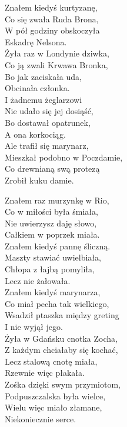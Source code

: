 \begin{multicols}{2}
Znałem kiedyś kurtyzanę, \\
Co się zwała Ruda Brona, \\
W pół godziny obskoczyła\\
Eskadrę Nelsona.\\

Żyła raz w Londynie dziwka, \\
Co ją zwali Krwawa Bronka, \\
Bo jak zaciskała uda, \\
Obcinała członka.\\

I żadnemu żeglarzowi\\
Nie udało się jej dosiąść, \\
Bo dostawał opatrunek, \\
A ona korkociąg.\\

Ale trafił się marynarz, \\
Mieszkał podobno w Poczdamie, \\
Co drewnianą swą protezą\\
Zrobił kuku damie.\\
\newcolumn

Znałem raz murzynkę w Rio, \\
Co w miłości była śmiała, \\
Nie uwierzysz daję słowo, \\
Całkiem w poprzek miała.\\

Znałem kiedyś pannę śliczną.\\
Maszty stawiać uwielbiała, \\
Chłopa z łajbą pomyliła, \\
Lecz nie żałowała.\\

Znałem kiedyś marynarza, \\
Co miał pecha tak wielkiego, \\
Wsadził ptaszka między greting\\
I nie wyjął jego.\\

Żyła w Gdańsku cnotka Zocha, \\
Z każdym chciałaby się kochać, \\
Lecz stalową cnotę miała, \\
Rzewnie więc płakała.\\

Zośka dzięki swym przymiotom, \\
Podpuszczalska była wielce, \\
Wielu więc miało złamane, \\
Niekoniecznie serce.\\


\end{multicols}
